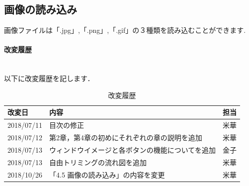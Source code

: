 \documentclass[12pt]{jsreport}
\begin{document}
\subsection{画像の読み込み}
画像ファイルは「.jpg」,「.png」,「.gif」の３種類を読み込むことができます.





\newpage
\paragraph{改変履歴} \\
以下に改変履歴を記します．
\begin{table}[htb]
\caption{改変履歴}
\begin{center}
\begin{tabular}{|l|l|l|}
    \hline
    改変日 & 内容 & 担当 \\ \hline
    2018/07/11 & 目次の修正 & 米華 \\ \hline
    2018/07/12 & 第2章，第4章の初めにそれぞれの章の説明を追加 & 米華 \\ \hline
    2018/07/13 & ウィンドウイメージと各ボタンの機能についてを追加 & 金子 \\ \hline
    2018/07/13 & 自由トリミングの流れ図を追加 & 米華 \\ \hline
    2018/10/26 & 「4.5 画像の読み込み」の内容を変更 & 米華 \\ \hline
\end{tabular}
\end{center}
\end{table}
\end{document}
